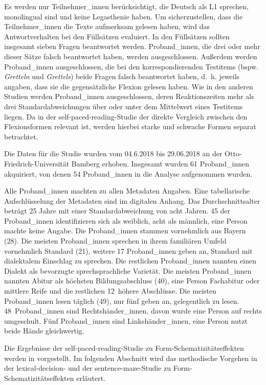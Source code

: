 Es werden nur Teilnehmer\_innen berücksichtigt, die Deutsch als L1 sprechen, monolingual sind und keine Legasthenie haben. Um sicherzustellen, dass die Teilnehmer\_innen die Texte aufmerksam gelesen haben, wird das Antwortverhalten bei den Füllsätzen evaluiert. In den Füllsätzen sollten insgesamt sieben Fragen beantwortet werden. Proband\_innen, die drei oder mehr dieser Sätze falsch beantwortet haben, werden ausgeschlossen. Außerdem werden Proband\_innen ausgeschlossen, die bei den korrespondierenden Testitems (bspw. \textit{Gretteln} und \textit{Grettels}) beide Fragen falsch beantwortet haben, d.~h. jeweils angaben, dass sie die gegensätzliche Flexion gelesen haben. Wie in den anderen Studien werden Proband\_innen ausgeschlossen, deren Reaktionszeiten mehr als drei Standardabweichungen
über oder unter dem Mittelwert eines Testitems liegen. Da in der self-paced-reading-Studie der direkte Vergleich zwischen den Flexionsformen relevant ist, werden hierbei starke und schwache Formen separat betrachtet.

Die Daten für die Studie wurden vom 04.6.2018 bis 29.06.2018 an der Otto-Friedrich-Universität Bamberg erhoben. Insgesamt wurden 61 Proband\_innen akquiriert, von denen 54 Proband\_innen in die Analyse aufgenommen wurden.\largerpage


Alle Proband\_innen machten zu allen Metadaten Angaben. Eine tabellarische Aufschlüsselung der Metadaten sind im digitalen Anhang. Das Durchschnittsalter beträgt 25 Jahre mit einer Standardabweichung von acht Jahren. 45 der Proband\_innen identifizieren sich als weiblich, acht als männlich, eine Person machte keine Angabe. Die Proband\_innen stammen vornehmlich aus Bayern (28). Die meisten Proband\_innen sprechen in ihrem familiären Umfeld vornehmlich Standard (21), weitere 17 Proband\_innen geben an, Standard mit dialektalem Einschlag zu sprechen. Die restlichen Proband\_innen nannten einen Dialekt als bevorzugte sprechsprachliche Varietät. Die meisten Proband\_innen nannten Abitur als höchsten Bildungsabschluss (40), eine Person Fachabitur oder mittlere Reife und die restlichen 12~höhere Abschlüsse. Die meisten Proband\_innen lesen täglich (49), nur fünf geben an, gelegentlich zu lesen. 48~Proband\_innen sind Rechtshänder\_innen, davon wurde eine Person auf rechts umgeschult. Fünf Proband\_innen sind Linkshänder\_innen, eine Person nutzt beide Hände gleichwertig.


Die Ergebnisse der self-paced-reading-Studie zu Form-Schematizitätseffekten werden in  vorgestellt. Im folgenden Abschnitt wird das methodische Vorgehen in der lexical-decision- und der sentence-maze-Studie zu Form-Sche\-ma\-ti\-zi\-täts\-ef\-fek\-ten erläutert.

